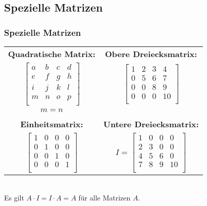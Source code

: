 \documentclass{beamer}
\begin{document}
\subsection{Spezielle Matrizen}
\begin{frame}
  \frametitle{Spezielle Matrizen}
  \begin{tabular}{cc}
    \textbf{Quadratische Matrix:} & \textbf{Obere Dreiecksmatrix:}\\ 
    $\begin{bmatrix}
      a & b & c & d \\
      e & f & g & h \\
      i & j & k & l \\
      m & n & o & p \\
    \end{bmatrix}
      $ & $ \begin{bmatrix}
        1 & 2 & 3 & 4 \\
        0 & 5 & 6 & 7 \\
        0 & 0 & 8 & 9 \\
        0 & 0 & 0 & 10 \\       
      \end{bmatrix}$\\
      $m=n$ &\\
      \\
      \textbf{Einheitsmatrix:} & \textbf{Untere Dreiecksmatrix:} \\
     $ \begin{bmatrix}
      1 & 0 & 0 & 0 \\
      0 & 1 & 0 & 0 \\
      0 & 0 & 1 & 0 \\
      0 & 0 & 0 & 1 \\
    \end{bmatrix}$ 
    &
    $ I = \begin{bmatrix}
      1 & 0 & 0 & 0 \\
      2 & 3 & 0 & 0 \\
      4 & 5 & 6 & 0 \\
      7 & 8 & 9 & 10 \\       
    \end{bmatrix}$\\   
  \end{tabular}\\
  \vspace{0.3cm}
  Es gilt $A\cdot I = I \cdot A = A$ für alle Matrizen $A$.
  
\end{frame}
\end{document}
